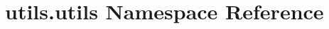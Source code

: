 \hypertarget{namespaceutils_1_1utils}{}\section{utils.\+utils Namespace Reference}
\label{namespaceutils_1_1utils}
